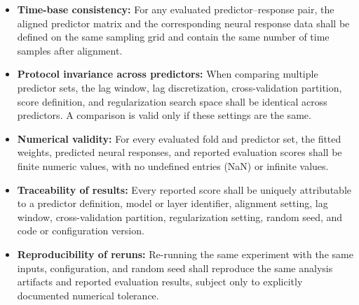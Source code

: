 \documentclass[12pt]{article}
\newcommand{\aref}[1]{A\ref{#1}}
\begin{document}


\begin{itemize}
  \item \textbf{Time-base consistency:}
  For any evaluated predictor--response pair, the aligned predictor matrix and the corresponding neural response data shall be defined on the same sampling grid and contain the same number of time samples after alignment.

  \item \textbf{Protocol invariance across predictors:}
  When comparing multiple predictor sets, the lag window, lag discretization, cross-validation partition, score definition, and regularization search space shall be identical across predictors. A comparison is valid only if these settings are the same.

  \item \textbf{Numerical validity:}
  For every evaluated fold and predictor set, the fitted weights, predicted neural responses, and reported evaluation scores shall be finite numeric values, with no undefined entries (NaN) or infinite values.

  \item \textbf{Traceability of results:}
  Every reported score shall be uniquely attributable to a predictor definition, model or layer identifier, alignment setting, lag window, cross-validation partition, regularization setting, random seed, and code or configuration version.

  \item \textbf{Reproducibility of reruns:}
  Re-running the same experiment with the same inputs, configuration, and random seed shall reproduce the same analysis artifacts and reported evaluation results, subject only to explicitly documented numerical tolerance.
\end{itemize}




\end{document}
